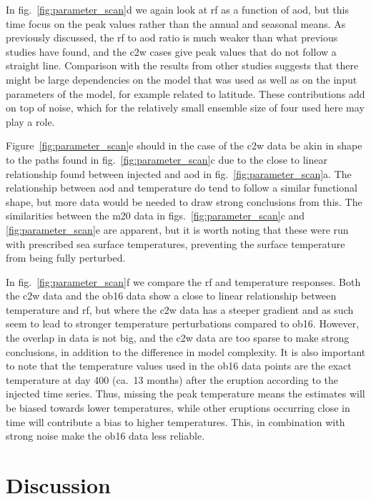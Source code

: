 \documentclass{ametsocV6.1}
\newcommand{\iso}[1][i]{{#1}njected \ce{SO2}}
\begin{document}
In fig.~\ref{fig:parameter_scan}d we again look at \gls{rf} as a function of \gls{aod},
but this time focus on the peak values rather than the annual and seasonal means. As
previously discussed, the \gls{rf} to \gls{aod} ratio is much weaker than what previous
studies have found, and the \gls{c2w} cases give peak values that do not follow a
straight line. Comparison with the results from other studies \citep{jones2005,
  marshall2020, timmreck2010} suggests that there might be large dependencies on the model
that was used as well as on the input parameters of the model, for example related to
latitude. These contributions add on top of noise, which for the relatively small
ensemble size of four used here may play a role.

Figure~\ref{fig:parameter_scan}e should in the case of the \gls{c2w} data be akin in
shape to the paths found in fig.~\ref{fig:parameter_scan}c due to the close to linear
relationship found between \iso{} and \gls{aod} in fig.~\ref{fig:parameter_scan}a. The
relationship between \gls{aod} and temperature do tend to follow a similar functional
shape, but more data would be needed to draw strong conclusions from this. The
similarities between the \gls{m20} data in figs.~\ref{fig:parameter_scan}c and
\ref{fig:parameter_scan}e are apparent, but it is worth noting that these were run with
prescribed sea surface temperatures, preventing the surface temperature from being fully
perturbed.

In fig.~\ref{fig:parameter_scan}f we compare the \gls{rf} and temperature responses.
Both the \gls{c2w} data and the \gls{ob16} data show a close to linear relationship
between temperature and \gls{rf}, but where the \gls{c2w} data has a steeper gradient
and as such seem to lead to stronger temperature perturbations compared to \gls{ob16}.
However, the overlap in data is not big, and the \gls{c2w} data are too sparse to make
strong conclusions, in addition to the difference in model complexity. It is also
important to note that the temperature values used in the \gls{ob16} data points are the
exact temperature at day 400 (ca.\ 13 months) after the eruption according to the \iso{}
time series. Thus, missing the peak temperature means the estimates will be biased
towards lower temperatures, while other eruptions occurring close in time will
contribute a bias to higher temperatures. This, in combination with strong noise make
the \gls{ob16} data less reliable.

\section{Discussion}\label{sec:discussion}
\end{document}

